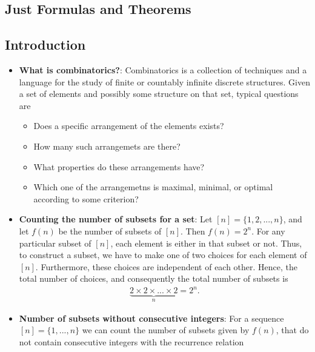 \documentclass{report}
\begin{document}
    \pagebreak 
    \subsection{Just Formulas and Theorems}
    \begin{itemize}
    \end{itemize}

    \pagebreak 
    \bigbreak \noindent 
    \subsection{Introduction}
    \begin{itemize}
        \item \textbf{What is combinatorics?}: Combinatorics is a collection of techniques and a language for the study of finite or countably infinite discrete structures. Given a set of elements and possibly some structure on that set, typical questions are
            \begin{itemize}
                \item Does a specific arrangement of the elements exists?
                \item How many such arrangemets are there?
                \item What properties do these arrangements have?
                \item Which one of the arrangemetns is maximal, minimal, or optimal according to some criterion?
            \end{itemize}
        \item \textbf{Counting the number of subsets for a set}: Let $[n] = \{1,2,...,n\} $, and let $f(n)$ be the number of subsets of $[n]$. Then $f(n) = 2^{n}$. For any particular subset of $[n]$, each element is either in that subset or not. Thus, to construct a subset, we have to make one of two choices for each element of $[n]$. Furthermore, these choices are independent of each other. Hence, the total number of choices, and consequently the total number of subsets is 
            \begin{align*}
                \underbrace{2\times2\times...\times2}_{n} = 2^{n}
            .\end{align*}
        \item \textbf{Number of subsets without consecutive integers}: For a sequence $[n] = \{1,...,n\}$ we can count the number of subsets given by $f(n)$, that do not contain consecutive integers with the recurrence relation
            \begin{align*}

\end{align*}
\end{itemize}
\end{document}
